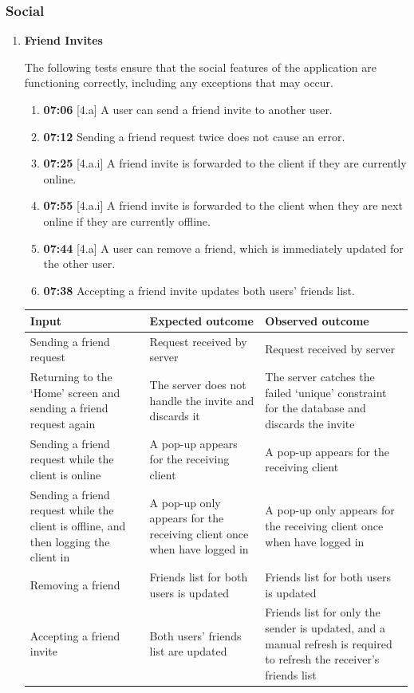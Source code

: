 \documentclass{article}
\begin{document}
\subsubsection{Social}

\begin{enumerate}
    \item \textbf{Friend Invites}
    
    The following tests ensure that the social features of the application are functioning correctly, including any exceptions that may occur.
    
    \begin{enumerate}
        \item \textbf{07:06} [4.a] A user can send a friend invite to another user.
        \item \textbf{07:12} Sending a friend request twice does not cause an error.
        \item \textbf{07:25} [4.a.i] A friend invite is forwarded to the client if they are currently online.
        \item \textbf{07:55} [4.a.i] A friend invite is forwarded to the client when they are next online if they are currently offline.
        \item \textbf{07:44} [4.a] A user can remove a friend, which is immediately updated for the other user.
        \item \textbf{07:38} Accepting a friend invite updates both users' friends list.
    \end{enumerate}

    \begin{table}[H]
    \centering
        \begin{tabularx}{\textwidth}{|L|L|L|}
        \hline
        \textbf{Input} & \textbf{Expected outcome} & \textbf{Observed outcome} \\\hline
        Sending a friend request & Request received by server & Request received by server \\\hline
        Returning to the `Home' screen and sending a friend request again & The server does not handle the invite and discards it & The server catches the failed `unique' constraint for the database and discards the invite \\\hline
        Sending a friend request while the client is online & A pop-up appears for the receiving client & A pop-up appears for the receiving client \\\hline
        Sending a friend request while the client is offline, and then logging the client in & A pop-up only appears for the receiving client once when have logged in & A pop-up only appears for the receiving client once when have logged in \\\hline
        Removing a friend & Friends list for both users is updated & Friends list for both users is updated \\\hline
        Accepting a friend invite & Both users' friends list are updated & Friends list for only the sender is updated, and a manual refresh is required to refresh the receiver's friends list \\\hline
        \end{tabularx}
    \end{table}


\end{enumerate}
\end{document}

